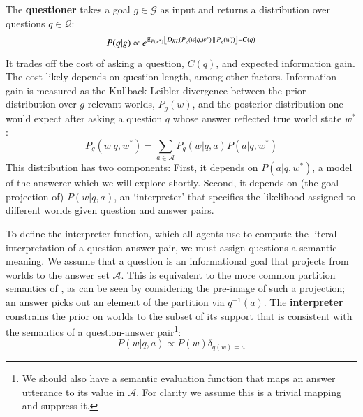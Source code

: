 \documentclass[12pt, floatsintext, man]{apa6}
\begin{document}
The \textbf{questioner} takes a goal $g \in \mathcal{G}$ as input and returns a distribution over questions $q \in \mathcal{Q}$:
%
$$ 
P(q|g) \propto e^{\mathbb{E}_{P(w^*)}\left [D_{KL}({P_g(w|q, w^*)}\, \| \, {P_g(w)}) \right] - C(q)} 
$$
%
It trades off the cost of asking a question, $C(q)$, and expected information gain. The cost likely depends on question length, among other factors. Information gain is measured as the Kullback-Leibler divergence between the prior distribution over $g$-relevant worlds, $P_g(w)$, and the posterior distribution one would expect after asking a question $q$ whose answer reflected true world state $w^*$:
%
$$ P_g(w|q, w^*) = \sum_{a \in \mathcal{A}} P_g(w |q, a) P(a| q, w^*)$$
%
This distribution has two components: 
First, it depends on $P(a | q, w^*)$, a model of the answerer which we will explore shortly.
Second, it depends on (the goal projection of) $P(w | q, a)$, an `interpreter' that specifies the likelihood assigned to different worlds given question and answer pairs.

To define the interpreter function, which all agents use to compute the literal interpretation of a question-answer pair, we must assign questions a semantic meaning.
We assume that a question is an informational goal that projects from worlds to the answer set $\mathcal{A}$.
This is equivalent to the more common partition semantics of , as can be seen by considering the pre-image of such a projection; an answer picks out an element of the partition via $q^{-1}(a)$.
The \textbf{interpreter} constrains the prior on worlds to the subset of its support that is consistent with the semantics of a question-answer pair\footnote{We should also have a semantic evaluation function that maps an answer utterance to its value in $\mathcal{A}$. For clarity we assume this is a trivial mapping and suppress it.}:
%
$$P(w | q, a) \propto P(w) \delta_{q(w)=a}$$
\end{document}
